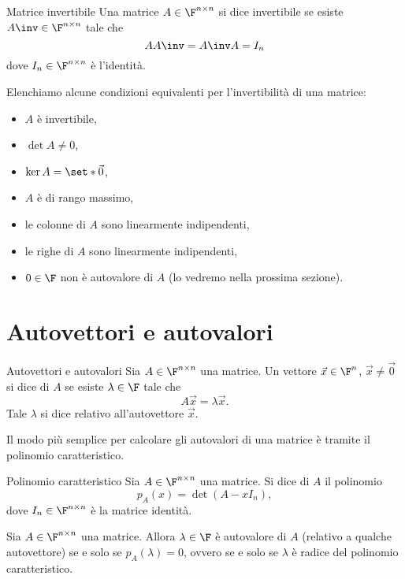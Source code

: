 \begin{definition}
    {Matrice invertibile}{}
    Una matrice $A \in \Mat{\F, n, n}$ si dice invertibile se esiste $A\inv \in \Mat{\F, n, n}$ tale che \[
        AA\inv = A\inv A = I_n
    \] dove $I_n \in \Mat{\F, n, n}$ è l'identità. 
\end{definition}

Elenchiamo alcune condizioni equivalenti per l'invertibilità di una matrice: \begin{itemize}
    \item $A$ è invertibile,
    \item $\det A \neq 0$,
    \item $\ker A = \set*{\vec 0}$,
    \item $A$ è di rango massimo,
    \item le colonne di $A$ sono linearmente indipendenti,
    \item le righe di $A$ sono linearmente indipendenti,
    \item $0 \in \F$ non è autovalore di $A$ (lo vedremo nella prossima sezione).   
\end{itemize}

\section{Autovettori e autovalori}

\begin{definition}
    {Autovettori e autovalori}{}
    Sia $A \in \Mat{\F, n, n}$ una matrice. Un vettore $\vec x \in \F^n$, $\vec x \neq \vec 0$ si dice  di $A$ se esiste $\lambda \in \F$ tale che \[
        A\vec x = \lambda\vec x.
    \] Tale $\lambda$ si dice  relativo all'autovettore $\vec x$.
\end{definition}

Il modo più semplice per calcolare gli autovalori di una matrice è tramite il polinomio caratteristico.

\begin{definition}
    {Polinomio caratteristico}{}
    Sia $A \in \Mat{\F, n, n}$ una matrice. Si dice  di $A$ il polinomio \[
        p_A(x) = \det (A - xI_n),  
    \] dove $I_n \in \Mat{\F, n, n}$ è la matrice identità. 
\end{definition}

\begin{proposition}{}{}
    Sia $A \in \Mat{\F, n, n}$ una matrice. Allora $\lambda \in \F$ è autovalore di $A$ (relativo a qualche autovettore) se e solo se $p_A(\lambda) = 0$, ovvero se e solo se $\lambda$ è radice del polinomio caratteristico. 
\end{proposition}

